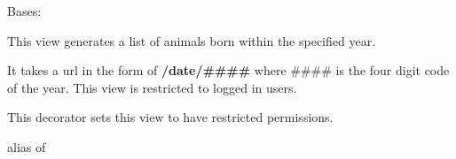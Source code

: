 \documentclass[letterpaper,10pt,english]{sphinxmanual}
\begin{document}
\begin{fulllineitems}
\label{api:mousedb.animal.views.AnimalYearArchive}
Bases: \href{http://docs.djangoproject.com/en/dev/ref/class-based-views/\#django.views.generic.dates.YearArchiveView}{}

This view generates a list of animals born within the specified year.

It takes a url in the form of \textbf{/date/\#\#\#\#} where \#\#\#\# is the four digit code of the year.
This view is restricted to logged in users.


\begin{fulllineitems}
\label{api:mousedb.animal.views.AnimalYearArchive.dispatch}
This decorator sets this view to have restricted permissions.

\end{fulllineitems}



\begin{fulllineitems}
\label{api:mousedb.animal.views.AnimalYearArchive.model}
alias of 

\end{fulllineitems}


\end{fulllineitems}


\end{document}
